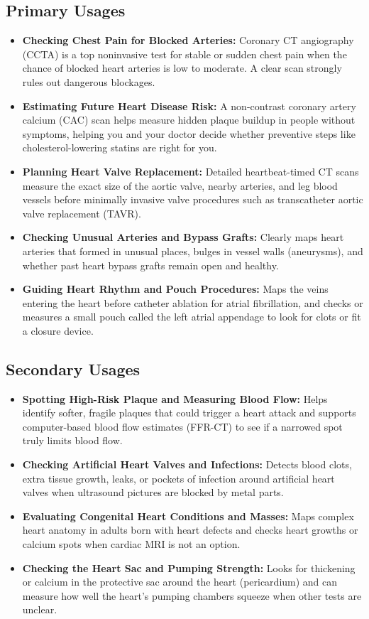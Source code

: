 \subsection{Primary Usages}
\begin{itemize}
    \item \textbf{Checking Chest Pain for Blocked Arteries:} Coronary CT angiography (CCTA) is a top noninvasive test for stable or sudden chest pain when the chance of blocked heart arteries is low to moderate. A clear scan strongly rules out dangerous blockages.
    \item \textbf{Estimating Future Heart Disease Risk:} A non-contrast coronary artery calcium (CAC) scan helps measure hidden plaque buildup in people without symptoms, helping you and your doctor decide whether preventive steps like cholesterol-lowering statins are right for you.
    \item \textbf{Planning Heart Valve Replacement:} Detailed heartbeat-timed CT scans measure the exact size of the aortic valve, nearby arteries, and leg blood vessels before minimally invasive valve procedures such as transcatheter aortic valve replacement (TAVR).
    \item \textbf{Checking Unusual Arteries and Bypass Grafts:} Clearly maps heart arteries that formed in unusual places, bulges in vessel walls (aneurysms), and whether past heart bypass grafts remain open and healthy.
    \item \textbf{Guiding Heart Rhythm and Pouch Procedures:} Maps the veins entering the heart before catheter ablation for atrial fibrillation, and checks or measures a small pouch called the left atrial appendage to look for clots or fit a closure device.
\end{itemize}

\subsection{Secondary Usages}
\begin{itemize}
    \item \textbf{Spotting High-Risk Plaque and Measuring Blood Flow:} Helps identify softer, fragile plaques that could trigger a heart attack and supports computer-based blood flow estimates (FFR-CT) to see if a narrowed spot truly limits blood flow.
    \item \textbf{Checking Artificial Heart Valves and Infections:} Detects blood clots, extra tissue growth, leaks, or pockets of infection around artificial heart valves when ultrasound pictures are blocked by metal parts.
    \item \textbf{Evaluating Congenital Heart Conditions and Masses:} Maps complex heart anatomy in adults born with heart defects and checks heart growths or calcium spots when cardiac MRI is not an option.
    \item \textbf{Checking the Heart Sac and Pumping Strength:} Looks for thickening or calcium in the protective sac around the heart (pericardium) and can measure how well the heart's pumping chambers squeeze when other tests are unclear.
\end{itemize}

